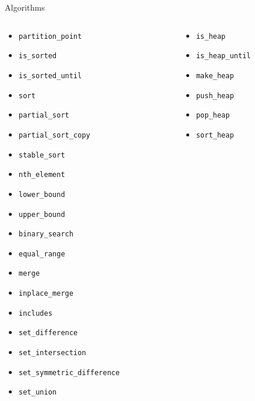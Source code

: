 \documentclass[aspectratio=169]{beamer}
\begin{document}
\begin{frame}{Algorithms}
  \tiny
  \begin{columns}
    \begin{column}{.33\textwidth}
      \begin{itemize}
        \item{\texttt{partition_point}}
        \item{\texttt{is_sorted}}
        \item{\texttt{is_sorted_until}}
        \item{\texttt{sort}}
        \item{\texttt{partial_sort}}
        \item{\texttt{partial_sort_copy}}
        \item{\texttt{stable_sort}}
        \item{\texttt{nth_element}}
        \item{\texttt{lower_bound}}
        \item{\texttt{upper_bound}}
        \item{\texttt{binary_search}}
        \item{\texttt{equal_range}}
        \item{\texttt{merge}}
        \item{\texttt{inplace_merge}}
        \item{\texttt{includes}}
        \item{\texttt{set_difference}}
        \item{\texttt{set_intersection}}
        \item{\texttt{set_symmetric_difference}}
        \item{\texttt{set_union}}
      \end{itemize}
    \end{column}
    \begin{column}{.33\textwidth}
      \begin{itemize}
        \item{\texttt{is_heap}}
        \item{\texttt{is_heap_until}}
        \item{\texttt{make_heap}}
        \item{\texttt{push_heap}}
        \item{\texttt{pop_heap}}
        \item{\texttt{sort_heap}}

\end{itemize}
\end{column}
\end{columns}
\end{frame}
\end{document}
